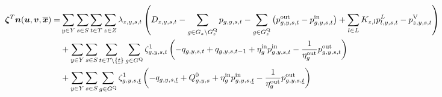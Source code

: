 \documentclass{article}
\begin{document}
\begin{align}
	\begin{split}
		\bm{\zeta}^{T} \bm{n}(\bm{u}, \bm{v}, \bm{\overline{x}}) = 	& \sum\limits_{\iYear \in \sYears}\sum\limits_{\iScenario \in \sScenarios}\sum\limits_{\iInterval \in \sIntervals} \sum\limits_{\iZone \in \sZones} \dPowerBalance \left(\cDemand - \sum\limits_{\iGenerator \in \sGenerators_{\iZone} \setminus \sStorage_{\iZone}} \vPower - \sum\limits_{\iGenerator \in \sStorage_{\iZone}} \left(\vPowerOut - \vPowerIn\right) + \sum\limits_{\iLink \in \sLinks} \cIncidenceMatrix \vPowerFlow - \vLostLoadPower \right)\\
		& + \sum\limits_{\iYear \in \sYears}\sum\limits_{\iScenario \in \sScenarios}\sum\limits_{\iInterval \in \sIntervals \setminus \{\iIntervalStart\}} \sum\limits_{\iGenerator \in \sStorage} \dStorageEnergyTransition \left(-\vStorageUnitEnergy + \vStorageUnitEnergy[\iGenerator,\iYear,\iScenario,\iInterval-1] + \cStorageUnitEfficiencyCharging \vPowerIn - \frac{1}{\cStorageUnitEfficiencyDischarging} \vPowerOut \right)\\
		& + \sum\limits_{\iYear \in \sYears} \sum\limits_{\iScenario \in \sScenarios} \sum\limits_{\iGenerator \in \sStorage} \dStorageEnergyTransition[\iGenerator,\iYear,\iScenario,\iIntervalStart] \left(-\vStorageUnitEnergy[\iGenerator,\iYear,\iScenario,\iIntervalStart] + \cStorageEnergyInitial + \cStorageUnitEfficiencyCharging \vPowerIn[\iGenerator,\iYear,\iScenario,\iIntervalStart] - \frac{1}{\cStorageUnitEfficiencyDischarging} \vPowerOut[\iGenerator,\iYear,\iScenario,\iIntervalStart] \right)\\

\end{split}
\end{align}
\end{document}

